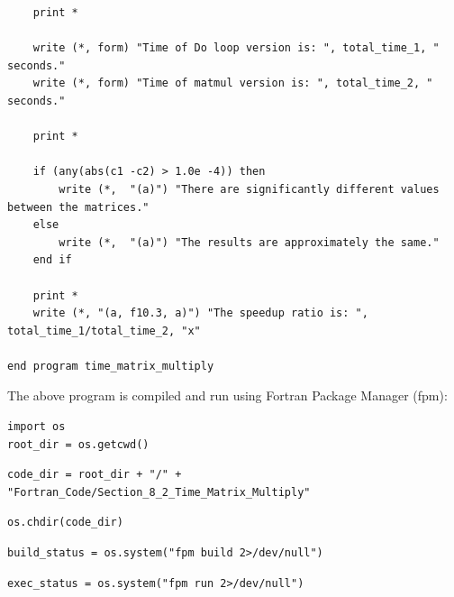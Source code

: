 \begin{verbatim}
    print *

    write (*, form) "Time of Do loop version is: ", total_time_1, " seconds."
    write (*, form) "Time of matmul version is: ", total_time_2, " seconds."

    print *

    if (any(abs(c1 -c2) > 1.0e -4)) then
        write (*,  "(a)") "There are significantly different values between the matrices."
    else
        write (*,  "(a)") "The results are approximately the same."
    end if

    print *
    write (*, "(a, f10.3, a)") "The speedup ratio is: ", total_time_1/total_time_2, "x"

end program time_matrix_multiply
\end{verbatim}

The above program is compiled and run using Fortran Package Manager (fpm):

\begin{verbatim}
import os
root_dir = os.getcwd()
\end{verbatim}

\begin{verbatim}
code_dir = root_dir + "/" + "Fortran_Code/Section_8_2_Time_Matrix_Multiply"
\end{verbatim}

\begin{verbatim}
os.chdir(code_dir)
\end{verbatim}

\begin{verbatim}
build_status = os.system("fpm build 2>/dev/null")
\end{verbatim}

\begin{verbatim}
exec_status = os.system("fpm run 2>/dev/null")
\end{verbatim}

